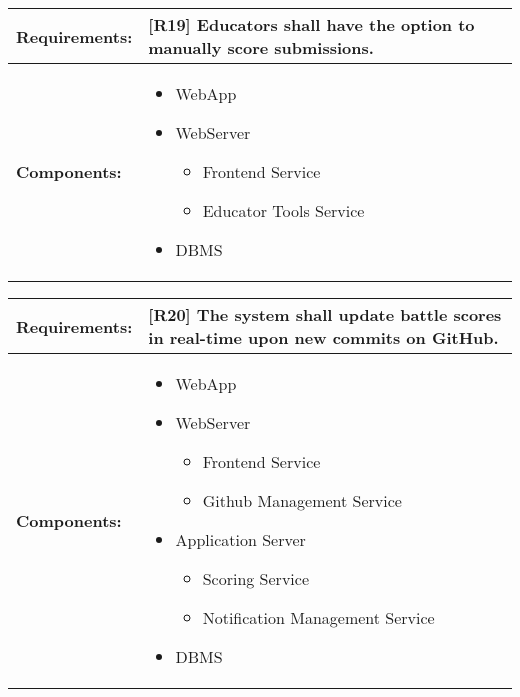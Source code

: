 \begin{table}[!ht]
    \centering
    {\renewcommand{\arraystretch}{2} %
    \setlength{\tabcolsep}{0.5em} %
    \begin{tabularx}{\textwidth}{|l|X|}
    \hline
       \textbf{Requirements:} & [R19] Educators shall have the option to manually score submissions.
       \\ \hline
        \textbf{Components:} & 
        \begin{minipage} [t] {0.4\textwidth} 
      \begin{itemize}
      \item WebApp
      \item WebServer
        \begin{itemize}
            \item Frontend Service
            \item Educator Tools Service
        \end{itemize}
      \item DBMS
     \end{itemize} 
    \end{minipage} \\ [2pt]  \hline
    \end{tabularx}} \quad
\end{table}

\begin{table}[!ht]
    \centering
    {\renewcommand{\arraystretch}{2} %
    \setlength{\tabcolsep}{0.5em} %
    \begin{tabularx}{\textwidth}{|l|X|}
    \hline
       \textbf{Requirements:} & [R20] The system shall update battle scores in real-time upon new commits on GitHub.
       \\ \hline
        \textbf{Components:} & 
        \begin{minipage} [t] {0.4\textwidth} 
      \begin{itemize}
      \item WebApp
      \item WebServer
        \begin{itemize}
            \item Frontend Service
            \item Github Management Service
        \end{itemize}
      \item Application Server
        \begin{itemize}
            \item Scoring Service
            \item Notification Management Service
        \end{itemize}
      \item DBMS
     \end{itemize} 
    \end{minipage} \\ [2pt]  \hline
    \end{tabularx}} \quad
\end{table}

